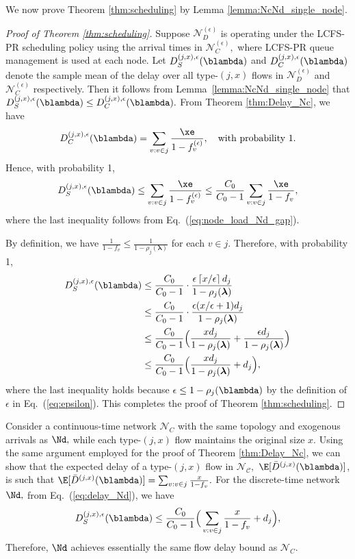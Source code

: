 We now prove Theorem \ref{thm:scheduling} by Lemma \ref{lemma:NcNd_single_node}.
\begin{proof}[Proof of Theorem \ref{thm:scheduling}]
Suppose $\mathcal{N}_{D}^{(\epsilon)}$ is operating under the LCFS-PR
scheduling policy using the arrival times in $\mathcal{N}_{C}^{(\epsilon)},$
where LCFS-PR queue management is used at each node. Let $D_S^{(j,x),\epsilon} (\blambda)$
and $D_{C}^{(j,x),\epsilon} (\blambda)$ denote the sample mean of the delay over all type-$(j,x)$
flows in $\mathcal{N}_{D}^{(\epsilon)}$ and $\mathcal{N}_{C}^{(\epsilon)}$
respectively. Then it follows from Lemma~\ref{lemma:NcNd_single_node}
that $D_S^{(j,x),\epsilon} (\blambda) \leq D_{C}^{(j,x),\epsilon} (\blambda).$ 
From Theorem
\ref{thm:Delay_Nc}, we have 
\[
D_{C}^{(j,x),\epsilon} (\blambda) =\sum_{v:v\in j}\frac{\xe}{1-f_{v}^{(\epsilon)}}, \quad \mbox{with probability } 1.
\]
Hence, with probability 1, 
\[
D^{(j,x),\epsilon}_S (\blambda) \leq\sum_{v:v\in j}\frac{\xe}{1-f_{v}^{(\epsilon)}}\leq\frac{C_{0}}{C_{0}-1}\sum_{v:v\in j}\frac{\xe}{1-f_{v}}, \label{eq:delay_Nd}
\]
where the last inequality follows from Eq.~(\ref{eq:node_load_Nd_gap}).

By definition,  we have $\frac{1}{1-f_{v}}\leq\frac{1}{1-\rho_{j}(\boldsymbol{\lambda})}$ for each $v\in j.$
Therefore, with probability 1, 
\begin{align*}
D^{(j,x),\epsilon}_S (\blambda) & \leq\frac{C_{0}}{C_{0}-1}\cdot\frac{\epsilon\left\lceil x/\epsilon\right\rceil d_{j}}{1-\rho_{j}(\boldsymbol{\lambda})} \\
& \leq\frac{C_{0}}{C_{0}-1}\cdot\frac{\epsilon (x/\epsilon + 1) d_{j}}{1-\rho_{j}(\boldsymbol{\lambda})} \\
& \leq\frac{C_{0}}{C_{0}-1}\Big(\frac{xd_{j}}{1-\rho_{j}(\boldsymbol{\lambda})} + \frac{\epsilon d_{j}}{1-\rho_{j}(\boldsymbol{\lambda})}\Big) \\
& \leq \frac{C_{0}}{C_{0}-1}\Big(\frac{xd_{j}}{1-\rho_{j}(\boldsymbol{\lambda})} +  d_{j} \Big),
\end{align*}
where the last inequality holds because $ \epsilon \le 1-\rho_j(\blambda) $ by the definition of $ \epsilon $ in Eq.~(\ref{eq:epsilon}).
This completes the proof of Theorem \ref{thm:scheduling}.
\end{proof}

\begin{rem}
	Consider a continuous-time network $\mathcal{N}_{C}$ with the same
	topology and exogenous arrivals as $\Nd,$ while each type-$(j,x)$
	flow maintains the original size $x.$ Using the same argument employed
	for the proof of Theorem \ref{thm:Delay_Nc}, we can show that the expected
	delay of a type-$(j,x)$ flow in $\mathcal{N_{C}},$ $\E[\bar{D}^{(j,x)} (\blambda)]$,
	is such that $\E[\bar{D}^{(j,x)} (\blambda)]=\sum_{v:v\in j}\frac{x}{1-f_{v}}.$ 
	For the discrete-time network $\Nd,$ from Eq.\ (\ref{eq:delay_Nd}), we have 
	\[
    D^{(j,x),\epsilon}_S (\blambda) \leq \frac{C_{0}}{C_{0}-1}\Big(\sum_{v:v\in j}\frac{x}{1-f_{v}} +  d_{j} \Big),
	\]
	Therefore, $\Nd$ achieves essentially the same flow delay bound as $\mathcal{N}_{C}$.
	
\end{rem}